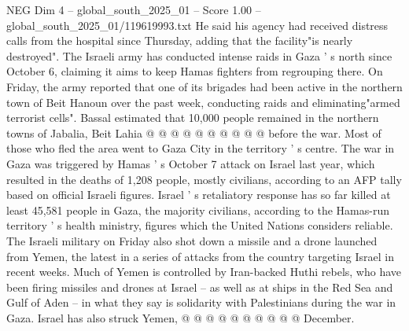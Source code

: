 \begin{textsample}{NEG Dim 4 – global\_south\_2025\_01 – Score 1.00 – global\_south\_2025\_01/119619993.txt}
He said his agency had received distress calls from the hospital since Thursday, adding that the facility"is nearly destroyed".
The Israeli army has conducted intense raids in Gaza ' s north since October 6, claiming it aims to keep Hamas fighters from regrouping there.
On Friday, the army reported that one of its brigades had been active in the northern town of Beit Hanoun over the past week, conducting raids and eliminating"armed terrorist cells".
Bassal estimated that 10,000 people remained in the northern towns of Jabalia, Beit Lahia @ @ @ @ @ @ @ @ @ @ before the war.
Most of those who fled the area went to Gaza City in the territory ' s centre.
The war in Gaza was triggered by Hamas ' s October 7 attack on Israel last year, which resulted in the deaths of 1,208 people, mostly civilians, according to an AFP tally based on official Israeli figures.
Israel ' s retaliatory response has so far killed at least 45,581 people in Gaza, the majority civilians, according to the Hamas-run territory ' s health ministry, figures which the United Nations considers reliable.
The Israeli military on Friday also shot down a missile and a drone launched from Yemen, the latest in a series of attacks from the country targeting Israel in recent weeks.
Much of Yemen is controlled by Iran-backed Huthi rebels, who have been firing missiles and drones at Israel -- as well as at ships in the Red Sea and Gulf of Aden -- in what they say is solidarity with Palestinians during the war in Gaza.
Israel has also struck Yemen, @ @ @ @ @ @ @ @ @ @ December.

\end{textsample}

